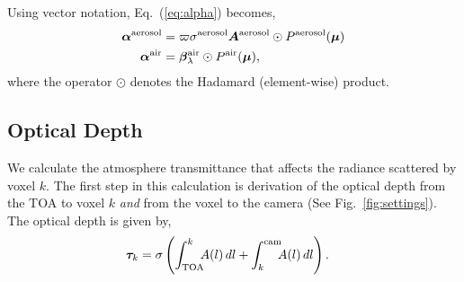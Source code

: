\documentclass[10pt,twocolumn,letterpaper]{article}
\newcommand{\vect}[1]{\bm{#1}}
\newcommand{\mat}[1]{\bm{#1}}
\newcommand{\derivsym}[1]{\,d{#1}}
\begin{document}
\noindent Using vector notation, Eq.~(\ref{eq:alpha}) becomes,
\begin{align}
  \vect{\alpha}^{\rm aerosol} &= \varpi \sigma^{\rm aerosol}
  \mat{A}^{\rm
    aerosol} \odot P^{\rm aerosol}(\vect{\mu}) \nonumber \\
  \vect{\alpha}^{\rm air} &= \vect{\beta}^{\rm air}_{\lambda} \odot
  P^{\rm air}(\vect{\mu}),
  \label{eq:alpha_matrix}
\end{align}
where the operator $\odot$ denotes the Hadamard (element-wise)
product.

\subsection{Optical Depth}
\label{sec:optical-depth}

We calculate the atmosphere transmittance that affects the radiance
scattered by voxel $k$.  The first step in this calculation is
derivation of the optical depth from the TOA to voxel $k$ \emph{and}
from the voxel to the camera (See Fig.~\ref{fig:settings}). The
optical depth is given by,
\begin{align}
  \vect{\tau}_{k} &= \sigma \left( \int_{\rm
      TOA}^{k}\!\!\!A(l)\derivsym{l} + \int_{k}^{\rm cam}\!\!\!A(l)
    \derivsym{l} \right).
  \label{eq:optical_depth}
\end{align}
\end{document}
